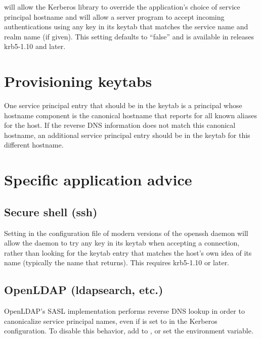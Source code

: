 \documentclass[letterpaper,10pt,english]{sphinxmanual}
\begin{document}
%
\begin{sphinxVerbatim}[commandchars=\\\{\}]
\PYG{p}{[}\PYG{p}{]}
      
\end{sphinxVerbatim}

will allow the Kerberos library to override the application’s choice
of service principal hostname and will allow a server program to
accept incoming authentications using any key in its keytab that
matches the service name and realm name (if given).  This setting
defaults to “false” and is available in releases krb5-1.10 and later.


\section{Provisioning keytabs}
\label{\detokenize{admin/princ_dns:provisioning-keytabs}}
One service principal entry that should be in the keytab is a
principal whose hostname component is the canonical hostname that
 reports for all known aliases for the host.  If the
reverse DNS information does not match this canonical hostname, an
additional service principal entry should be in the keytab for this
different hostname.


\section{Specific application advice}
\label{\detokenize{admin/princ_dns:specific-application-advice}}

\subsection{Secure shell (ssh)}
\label{\detokenize{admin/princ_dns:secure-shell-ssh}}
Setting  in the configuration file
of modern versions of the openssh daemon will allow the daemon to try
any key in its keytab when accepting a connection, rather than looking
for the keytab entry that matches the host’s own idea of its name
(typically the name that  returns).  This requires
krb5-1.10 or later.


\subsection{OpenLDAP (ldapsearch, etc.)}
\label{\detokenize{admin/princ_dns:openldap-ldapsearch-etc}}
OpenLDAP’s SASL implementation performs reverse DNS lookup in order to
canonicalize service principal names, even if  is set to
 in the Kerberos configuration.  To disable this behavior,
add  to , or set the
 environment variable.
\end{document}
